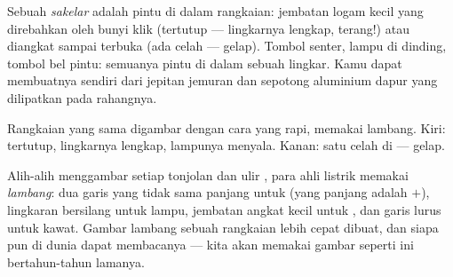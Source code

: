 \begin{example}[Sakelar]\label{ex:g3:first-electric-circuit:switch}
Sebuah \emph{sakelar} adalah pintu di dalam rangkaian:
jembatan logam kecil yang direbahkan oleh bunyi klik (tertutup ---
lingkarnya lengkap, terang!) atau diangkat sampai terbuka (ada celah
--- gelap). Tombol senter,  lampu di dinding, tombol bel pintu:
semuanya pintu di dalam sebuah lingkar. Kamu dapat membuatnya sendiri
dari jepitan jemuran dan sepotong aluminium dapur yang dilipatkan pada
rahangnya.
\end{example}

\begin{omfigure}

{\small Rangkaian yang sama digambar dengan cara yang rapi, memakai
lambang. Kiri:  tertutup, lingkarnya lengkap, lampunya menyala.
Kanan: satu celah di  --- gelap.}
\end{omfigure}

\begin{remark}\label{rem:g3:first-electric-circuit:symbols}
Alih-alih menggambar setiap tonjolan  dan ulir , para
ahli listrik memakai \emph{lambang}: dua garis yang tidak sama panjang
untuk  (yang panjang adalah $+$), lingkaran bersilang untuk
lampu, jembatan angkat kecil untuk , dan garis lurus untuk
kawat. Gambar lambang sebuah rangkaian lebih cepat dibuat, dan siapa
pun di dunia dapat membacanya --- kita akan memakai gambar seperti ini
bertahun-tahun lamanya.
\end{remark}

